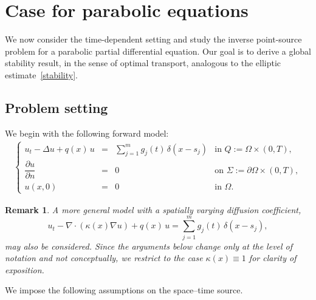 \documentclass[12pt]{amsart}
\newtheorem{remark}{Remark}
\begin{document}
\section{Case for parabolic equations}

We now consider the time-dependent setting and study the inverse point-source problem for a parabolic partial differential equation. Our goal is to derive a global stability result, in the sense of optimal transport, analogous to the elliptic estimate~\eqref{stability}.

\subsection{Problem setting}

We begin with the following forward model:
\begin{align}\label{directmodel 1}
\left\{
\begin{array}{ccll}
  u_t - \Delta u + q(x)\,u &=& \displaystyle\sum_{j=1}^{m} g_j(t)\,\delta(x-s_j)
  & \text{in } Q := \Omega\times(0,T), \\[0.4em]
  \dfrac{\partial u}{\partial n} &=& 0 
  & \text{on } \Sigma := \partial \Omega\times(0,T),\\[0.4em]
  u(x,0) &=& 0 
  & \text{in } \Omega.
\end{array}
\right.
\end{align}


\begin{remark}
A more general model with a spatially varying diffusion coefficient,
\[
    u_t - \nabla\cdot(\kappa(x)\nabla u) + q(x)\,u 
    = \sum_{j=1}^{m} g_j(t)\,\delta(x-s_j),
\]
may also be considered. Since the arguments below change only at the level of notation and not conceptually, we restrict to the case $\kappa(x)\equiv1$ for clarity of exposition.
\end{remark}

We impose the following assumptions on the space--time source.
\end{document}
